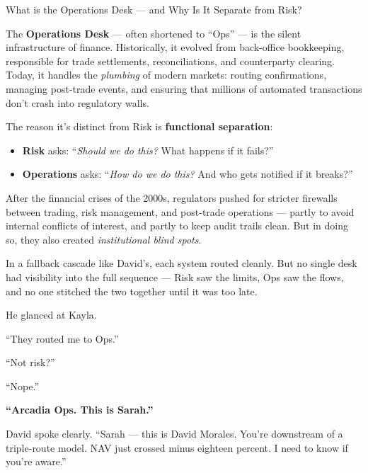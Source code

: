 \begin{HistoricalSidebar}{What is the Operations Desk — and Why Is It Separate from Risk?}

  The \textbf{Operations Desk} — often shortened to “Ops” — is the silent infrastructure of finance.  
  Historically, it evolved from back-office bookkeeping, responsible for trade settlements, reconciliations, 
  and counterparty clearing.  
  Today, it handles the \textit{plumbing} of modern markets: routing confirmations, managing post-trade events, 
  and ensuring that millions of automated transactions don't crash into regulatory walls.
  
  \medskip
  
  The reason it’s distinct from Risk is \textbf{functional separation}:

  \medskip
  
  \begin{itemize}
    \item \textbf{Risk} asks: “\textit{Should we do this?} What happens if it fails?”
    \item \textbf{Operations} asks: “\textit{How do we do this?} And who gets notified if it breaks?”
  \end{itemize}
  
  \medskip
  
  After the financial crises of the 2000s, regulators pushed for stricter firewalls between trading, risk management, 
  and post-trade operations — partly to avoid internal conflicts of interest, and partly to keep audit trails clean.  
  But in doing so, they also created \textit{institutional blind spots}.
  
  \medskip
  
  In a fallback cascade like David's, each system routed cleanly.  
  But no single desk had visibility into the full sequence — Risk saw the limits, Ops saw the flows,  
  and no one stitched the two together until it was too late.
  
\end{HistoricalSidebar}
  

He glanced at Kayla.

“They routed me to Ops.”

“Not risk?”

“Nope.”

\textbf{“Arcadia Ops. This is Sarah.”}

David spoke clearly. “Sarah — this is David Morales. You’re downstream of a triple-route model. NAV just crossed 
minus eighteen percent. I need to know if you’re aware.”

